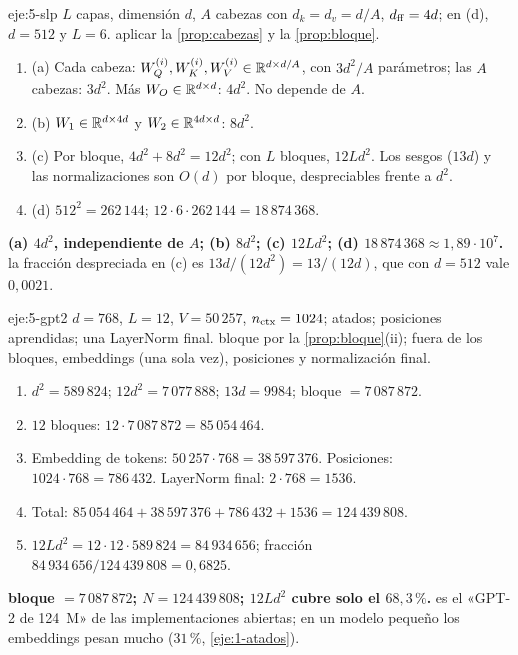 \begin{solucion}{eje:5-slp}
\datos $L$ capas, dimensión $d$, $A$ cabezas con $d_k=d_v=d/A$, $d_{\mathrm{ff}}=4d$; en (d), $d=512$ y $L=6$.
\planteamiento aplicar la \cref{prop:cabezas} y la \cref{prop:bloque}.
\pasos
\begin{enumerate}[label=\arabic*.]
  \item (a) Cada cabeza: $W_Q^{(i)},W_K^{(i)},W_V^{(i)}\in\mathbb{R}^{d\times d/A}$, con $3d^{2}/A$ parámetros; las $A$ cabezas: $3d^{2}$. Más $W_O\in\mathbb{R}^{d\times d}$: $4d^{2}$. No depende de $A$.
  \item (b) $W_1\in\mathbb{R}^{d\times 4d}$ y $W_2\in\mathbb{R}^{4d\times d}$: $8d^{2}$.
  \item (c) Por bloque, $4d^{2}+8d^{2}=12d^{2}$; con $L$ bloques, $12Ld^{2}$. Los sesgos ($13d$) y las normalizaciones son $O(d)$ por bloque, despreciables frente a $d^{2}$.
  \item (d) $512^{2}=262\,144$; $12\cdot 6\cdot 262\,144=18\,874\,368$.
\end{enumerate}
\resultado \textbf{(a) $4d^{2}$, independiente de $A$; (b) $8d^{2}$; (c) $12Ld^{2}$; (d) $18\,874\,368\approx 1{,}89\cdot 10^{7}$.}
\comprobacion la fracción despreciada en (c) es $13d/(12d^{2})=13/(12d)$, que con $d=512$ vale $0{,}0021$.
\end{solucion}

\begin{solucion}{eje:5-gpt2}
\datos $d=768$, $L=12$, $V=50\,257$, $n_{\mathrm{ctx}}=1024$; atados; posiciones aprendidas; una LayerNorm final.
\planteamiento bloque por la \cref{prop:bloque}(ii); fuera de los bloques, embeddings (una sola vez), posiciones y normalización final.
\pasos
\begin{enumerate}[label=\arabic*.]
  \item $d^{2}=589\,824$; $12d^{2}=7\,077\,888$; $13d=9984$; bloque $=7\,087\,872$.
  \item $12$ bloques: $12\cdot 7\,087\,872=85\,054\,464$.
  \item Embedding de tokens: $50\,257\cdot 768=38\,597\,376$. Posiciones: $1024\cdot 768=786\,432$. LayerNorm final: $2\cdot 768=1536$.
  \item Total: $85\,054\,464+38\,597\,376+786\,432+1536=124\,439\,808$.
  \item $12Ld^{2}=12\cdot 12\cdot 589\,824=84\,934\,656$; fracción $84\,934\,656/124\,439\,808=0{,}6825$.
\end{enumerate}
\resultado \textbf{bloque $=7\,087\,872$; $N=124\,439\,808$; $12Ld^{2}$ cubre solo el $68{,}3\,\%$.}
\comprobacion es el «GPT-2 de 124~M» de las implementaciones abiertas; en un modelo pequeño los embeddings pesan mucho ($31\,\%$, \cref{eje:1-atados}).
\end{solucion}

